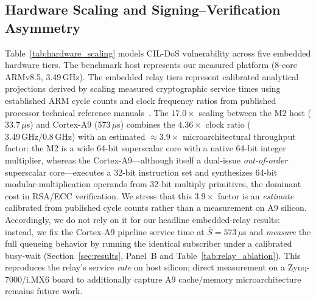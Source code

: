 \documentclass[journal]{IEEEtran}
\begin{document}
\subsection{Hardware Scaling and Signing--Verification Asymmetry}
Table~\ref{tab:hardware_scaling} models CIL-DoS vulnerability across five embedded hardware tiers. The benchmark host represents our measured platform (8-core ARMv8.5, 3.49\,GHz). The embedded relay tiers represent calibrated analytical projections derived by scaling measured cryptographic service times using established ARM cycle counts and clock frequency ratios from published processor technical reference manuals~\cite{arm2020cortex, arm_cortex_a9_trm, arm_cortex_r5, arm_cortex_m4}. The $17.0\times$ scaling between the M2 host ($33.7\,\mu$s) and Cortex-A9 ($573\,\mu$s) combines the $4.36\times$ clock ratio ($3.49\,\text{GHz}/0.8\,\text{GHz}$) with an estimated $\approx 3.9\times$ microarchitectural throughput factor: the M2 is a wide 64-bit superscalar core with a native 64-bit integer multiplier, whereas the Cortex-A9---although itself a dual-issue \emph{out-of-order} superscalar core---executes a 32-bit instruction set and synthesizes 64-bit modular-multiplication operands from 32-bit multiply primitives, the dominant cost in RSA/ECC verification. We stress that this $3.9\times$ factor is an \emph{estimate} calibrated from published cycle counts rather than a measurement on A9 silicon. Accordingly, we do not rely on it for our headline embedded-relay results: instead, we fix the Cortex-A9 pipeline service time at $\overline{S}=573\,\mu$s and \emph{measure} the full queueing behavior by running the identical subscriber under a calibrated busy-wait (Section~\ref{sec:results}, Panel~B and Table~\ref{tab:relay_ablation}). This reproduces the relay's service \emph{rate} on host silicon; direct measurement on a Zynq-7000/i.MX6 board to additionally capture A9 cache/memory microarchitecture remains future work.
\end{document}
